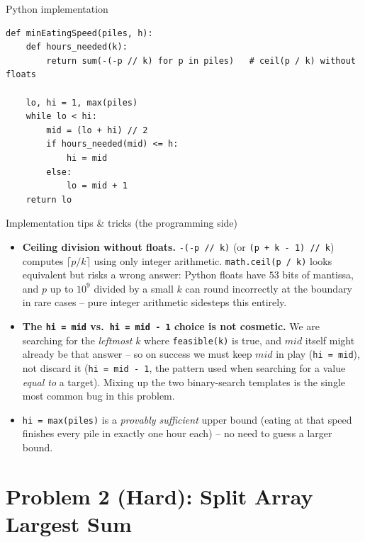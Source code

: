 \documentclass[11pt,aspectratio=169]{beamer}
\begin{document}
\begin{frame}[fragile]{Python implementation}
  \begin{lstlisting}[style=py]
def minEatingSpeed(piles, h):
    def hours_needed(k):
        return sum(-(-p // k) for p in piles)   # ceil(p / k) without floats

    lo, hi = 1, max(piles)
    while lo < hi:
        mid = (lo + hi) // 2
        if hours_needed(mid) <= h:
            hi = mid
        else:
            lo = mid + 1
    return lo
  \end{lstlisting}
\end{frame}

\begin{frame}{Implementation tips \& tricks (the programming side)}
  \small
  \begin{itemize}
    \item \textbf{Ceiling division without floats.} \texttt{-(-p // k)} (or
    \texttt{(p + k - 1) // k}) computes $\lceil p/k \rceil$ using only integer
    arithmetic. \texttt{math.ceil(p / k)} looks equivalent but risks a wrong answer:
    Python floats have $53$ bits of mantissa, and $p$ up to $10^9$ divided by a small
    $k$ can round incorrectly at the boundary in rare cases -- pure integer arithmetic
    sidesteps this entirely.
    \item \textbf{The \texttt{hi = mid} vs.\ \texttt{hi = mid - 1} choice is not
    cosmetic.} We are searching for the \emph{leftmost} $k$ where \texttt{feasible(k)}
    is true, and $mid$ itself might already be that answer -- so on success we must
    keep $mid$ in play (\texttt{hi = mid}), not discard it (\texttt{hi = mid - 1}, the
    pattern used when searching for a value \emph{equal to} a target). Mixing up the two
    binary-search templates is the single most common bug in this problem.
    \item \texttt{hi = max(piles)} is a \emph{provably sufficient} upper bound (eating at
    that speed finishes every pile in exactly one hour each) -- no need to guess a larger
    bound.
  \end{itemize}
\end{frame}

\section{Problem 2 (Hard): Split Array Largest Sum}
\end{document}
